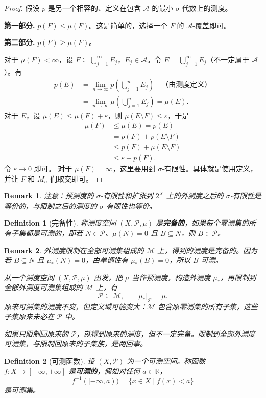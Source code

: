 \documentclass[12pt,letterpaper,twoside,openright]{ctexbook}
\theoremstyle{bluehead}
\theoremstyle{olivehead}
\newtheorem{definition}{Definition}
\theoremstyle{orangehead}
\theoremstyle{redremark}
\newtheorem*{remark}{Remark}
\begin{document}
\begin{proof}
假设 $p$ 是另一个相容的、定义在包含 $\mathcal{A}$ 的最小 $\sigma$-代数上的测度。

\textbf{第一部分.} $p(F)\leq\mu(F)$。这是简单的，选择一个 $F$ 的 $\mathcal{A}$-覆盖即可。

\textbf{第二部分.} $p(F)\geq\mu(F)$。

对于 $\mu(F)<\infty$，设 $F\subseteq\bigcup_{j=1}^{\infty}E_j$，$E_j\in\mathcal{A}$。令 $E=\bigcup_{j=1}^{\infty}E_j$（不一定属于 $\mathcal{A}$）。有
\[
\begin{aligned}
  p(E)
  &=\lim_{n\to\infty}p\!\left(\bigcup_{j=1}^{n}E_j\right)
    \quad\text{（由测度定义）}\\
  &=\lim_{n\to\infty}\mu\!\left(\bigcup_{j=1}^{n}E_j\right)
  =\mu(E).
\end{aligned}
\]
对于 $E$，设 $\mu(E)\leq\mu(F)+\varepsilon$，则 $\mu(E\setminus F)\leq\varepsilon$，于是
\[
\begin{aligned}
  \mu(F)&\leq\mu(E)=p(E)\\
  &=p(F)+p(E\setminus F)\\
  &\leq p(F)+\mu(E\setminus F)\\
  &\leq\varepsilon+p(F).
\end{aligned}
\]
令 $\varepsilon\to0$ 即可。
对于 $\mu(F)=\infty$，这里要用到 $\sigma$-有限性。具体就是使用定义，并让 $F$ 和 $M_n$ 们取交即可。
\end{proof}
\begin{remark}
注意：预测度的 $\sigma$-有限性和扩张到 $2^X$ 上的外测度之后的 $\sigma$-有限性是等价的，与限制之后的测度的 $\sigma$-有限性也等价。

\end{remark}

\begin{definition}[完备性]
称测度空间 $(X,\mathcal{P},\mu)$ 是\textbf{完备的}，如果每个零测集的所有子集都是可测的，即若 $N\in\mathcal{P}$、$\mu(N)=0$ 且 $B\subseteq N$，则 $B\in\mathcal{P}$。
\end{definition}

\begin{remark}
外测度限制在全部可测集组成的 $\mathcal{M}$ 上，得到的测度是完备的。因为若 $B\subseteq N$ 且 $\mu_*(N)=0$，由单调性有 $\mu_*(B)=0$，所以 $B$ 可测。

从一个测度空间 $(X,\mathcal{P},\mu)$ 出发，把 $\mu$ 当作预测度，构造外测度 $\mu_*$，再限制到全部外测度可测集组成的 $\mathcal{M}$ 上，有
\[
  \mathcal{P}\subseteq\mathcal{M},\qquad\mu_*|_{\mathcal{P}}=\mu.
\]
原来可测集的测度不变，但定义域可能变大：$\mathcal{M}$ 包含原零测集的所有子集，这些子集原来未必在 $\mathcal{P}$ 中。

如果只限制回原来的 $\mathcal{P}$，就得到原来的测度，但不一定完备。限制到全部外测度可测集，与限制回原来的子集族，是两回事。
\end{remark}
\begin{definition}[可测函数]
设 $(X,\mathcal{P})$ 为一个可测空间。称函数 $f\colon X\to[-\infty,+\infty]$ 是\textbf{可测的}，假如对任何 $a\in\mathbb{R}$，
\[
  f^{-1}([-\infty,a))=\{x\in X\mid f(x)<a\}
\]
是可测集。
\end{definition}
\end{document}
